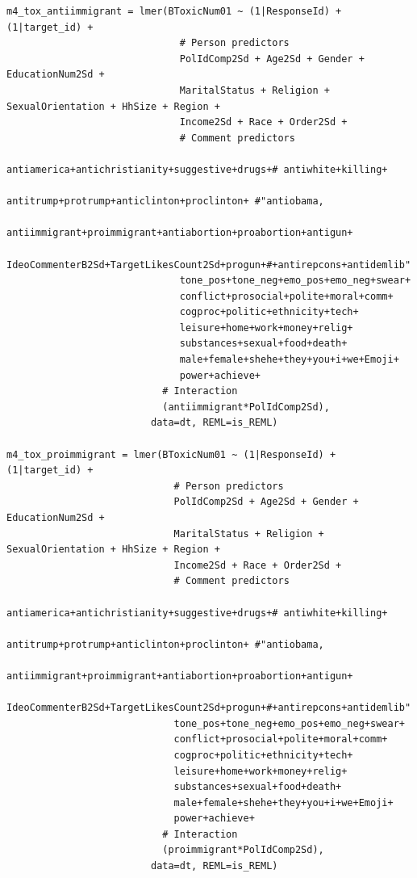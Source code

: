 \documentclass{article}
\begin{document}
\begin{lstlisting}
m4_tox_antiimmigrant = lmer(BToxicNum01 ~ (1|ResponseId) + (1|target_id) + 
                              # Person predictors
                              PolIdComp2Sd + Age2Sd + Gender + EducationNum2Sd + 
                              MaritalStatus + Religion + SexualOrientation + HhSize + Region + 
                              Income2Sd + Race + Order2Sd + 
                              # Comment predictors  
                              antiamerica+antichristianity+suggestive+drugs+# antiwhite+killing+
                              antitrump+protrump+anticlinton+proclinton+ #"antiobama,
                              antiimmigrant+proimmigrant+antiabortion+proabortion+antigun+
                              IdeoCommenterB2Sd+TargetLikesCount2Sd+progun+#+antirepcons+antidemlib"
                              tone_pos+tone_neg+emo_pos+emo_neg+swear+
                              conflict+prosocial+polite+moral+comm+
                              cogproc+politic+ethnicity+tech+
                              leisure+home+work+money+relig+  
                              substances+sexual+food+death+    
                              male+female+shehe+they+you+i+we+Emoji+
                              power+achieve+
                           # Interaction
                           (antiimmigrant*PolIdComp2Sd),
                         data=dt, REML=is_REML)

m4_tox_proimmigrant = lmer(BToxicNum01 ~ (1|ResponseId) + (1|target_id) + 
                             # Person predictors
                             PolIdComp2Sd + Age2Sd + Gender + EducationNum2Sd + 
                             MaritalStatus + Religion + SexualOrientation + HhSize + Region + 
                             Income2Sd + Race + Order2Sd + 
                             # Comment predictors  
                             antiamerica+antichristianity+suggestive+drugs+# antiwhite+killing+
                             antitrump+protrump+anticlinton+proclinton+ #"antiobama,
                             antiimmigrant+proimmigrant+antiabortion+proabortion+antigun+
                             IdeoCommenterB2Sd+TargetLikesCount2Sd+progun+#+antirepcons+antidemlib"
                             tone_pos+tone_neg+emo_pos+emo_neg+swear+
                             conflict+prosocial+polite+moral+comm+
                             cogproc+politic+ethnicity+tech+
                             leisure+home+work+money+relig+  
                             substances+sexual+food+death+    
                             male+female+shehe+they+you+i+we+Emoji+
                             power+achieve+
                           # Interaction
                           (proimmigrant*PolIdComp2Sd),
                         data=dt, REML=is_REML)


\end{lstlisting}
\end{document}
